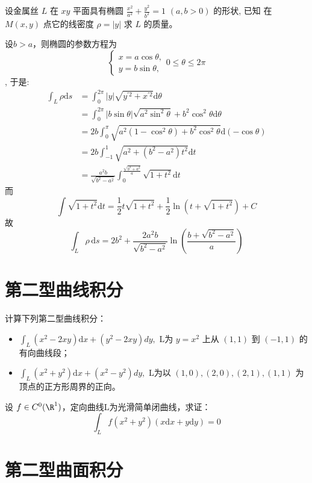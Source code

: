 \begin{problem}
    设金属丝 \(L\) 在 \(xy\) 平面具有椭圆 \(\frac{x^2}{a^2} + \frac{y^2}{b^2} =
    1\) \((a, b > 0)\) 的形状, 已知
    在 \(M(x, y)\) 点它的线密度 \(\rho = |y|\) 求 \(L\) 的质量。
\end{problem}

\begin{solution}
    设\(b>a\)，则椭圆的参数方程为 \[
        \begin{cases}
            x = a\cos\theta, \\
            y = b\sin\theta,
        \end{cases} 0\leq\theta\leq2\pi
    \], 于是:
    \begin{align*}
        \int_{L} \rho \mathrm{d}s &= \int_{0}^{2\pi} \left| y \right|
        \sqrt{y^{'2}+x^{'2}} \mathrm{d}\theta\\
        &=\int_{0}^{2\pi} \left| b\sin\theta \right|
        \sqrt{a^{2}\sin^{2}\theta}+b^{2}\cos^{2}\theta
        \mathrm{d}\theta \\
        &= 2b  \int_{0}^{\pi} \sqrt{a^{2}\left( 1-\cos^{2}\theta
        \right) + b^{2}\cos^{2}\theta } \mathrm{d}(-\cos\theta) \\
        &= 2b \int_{-1}^{1} \sqrt{a^{2}+\left( b^{2}-a^{2}
        \right)t^{2}} \mathrm{d}t\\
        &= \frac{a^{2}b}{\sqrt{b^{2}-a^{2}}}
        \int_{0}^{\frac{\sqrt{b^{2}+a^{2}}}{a}}
        \sqrt{1+t^{2}} \mathrm{d}t
    \end{align*}
    而\[
        \int \sqrt{1+t^{2}} \mathrm{d}t = \frac{1}{2}t\sqrt{1+t^{2}} +
        \frac{1}{2}\ln\left( t+\sqrt{1+t^{2}} \right) + C
    \]
    故\[
        \int_{L} \rho \, \mathrm{d}s =
        2b^{2}+\frac{2a^{2}b}{\sqrt{b^{2}-a^{2}}}\ln\left(
        \frac{b+\sqrt{b^{2}-a^{2}}}{a} \right)
    \]
\end{solution}
\section{第二型曲线积分}
\begin{problem}
    计算下列第二型曲线积分：
    \begin{itemize}
        \item \(\int_L (x^2 - 2xy) \mathrm{d}x + (y^2 -
            2xy) dy, \) L为 \(y =
            x^2\) 上从 \((1, 1)\) 到 \((-1, 1)\) 的有向曲线段；
        \item \( \int_L (x^2 + y^2) \mathrm{d}x + (x^2 -
            y^2) dy, \) L为以 \((1,
            0), (2, 0), (2, 1), (1, 1)\) 为顶点的正方形周界的正向。
    \end{itemize}
\end{problem}

\begin{problem}
    设 \(f \in C^0(\R^1)\)，定向曲线L为光滑简单闭曲线，求证：
    \[
        \int_L f(x^2 + y^2)(x \mathrm{d}x + y \mathrm{d}y) = 0
    \]
\end{problem}

\section{第二型曲面积分}
